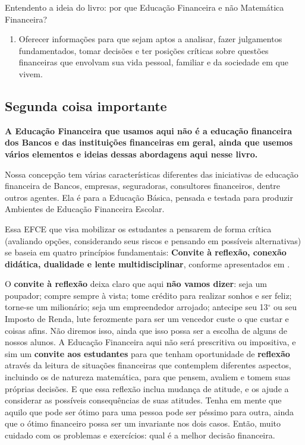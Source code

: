 \begin{apresentacao}{Entendento a ideia do livro: por que Educação Financeira e não Matemática Financeira?}
\begin{enumerate}[label=\arabic* --, leftmargin=0pt]
  \item Oferecer informações para que sejam aptos a analisar, fazer julgamentos fundamentados, tomar decisões e ter posições críticas sobre questões financeiras que envolvam sua vida pessoal, familiar e da sociedade em que vivem.
\end{enumerate}

\subsection{Segunda coisa importante} 
\begin{center}
\textbf{A Educação Financeira que usamos aqui não é a educação financeira dos Bancos e das instituições financeiras em geral, ainda que usemos vários elementos e ideias dessas abordagens aqui nesse livro.}
\end{center}

Nossa concepção tem várias características diferentes das iniciativas de educação financeira de Bancos, empresas, seguradoras, consultores financeiros, dentre outros agentes. Ela é para a Educação Básica, pensada e testada para produzir Ambientes de Educação Financeira Escolar. 

Essa EFCE que visa mobilizar os estudantes a pensarem de forma crítica (avaliando opções, considerando seus riscos e pensando em possíveis alternativas) se baseia em quatro princípios fundamentais: \textbf{Convite à reflexão, conexão didática, dualidade e lente multidisciplinar}, conforme apresentados em \cite{muniz2016b}.

O \textbf{convite à reflexão} deixa claro que aqui \textbf{não vamos dizer}: seja um poupador; compre sempre à vista; tome crédito para realizar sonhos e ser feliz; torne-se um milionário; seja um empreendedor arrojado; antecipe seu 13$^{\circ}$ ou seu Imposto de Renda, lute ferozmente para ser um vencedor custe o que custar e coisas afins. Não diremos isso, ainda que isso possa ser a escolha de alguns de nossos alunos. A Educação Financeira aqui não será prescritiva ou impositiva, e sim um  \textbf{convite aos estudantes} para que tenham oportunidade de \textbf{reflexão} através da leitura de situações financeiras que contemplem diferentes aspectos, incluindo os de natureza matemática, para que pensem, avaliem e tomem suas próprias decisões. E que essa reflexão inclua mudança de atitude, e os ajude a considerar as possíveis consequências de suas atitudes. Tenha em mente que aquilo que pode ser ótimo para uma pessoa pode ser péssimo para outra, ainda que o ótimo financeiro possa ser um invariante nos dois casos. Então, muito cuidado com os problemas e exercícios: qual é a melhor decisão financeira.


\end{apresentacao}
